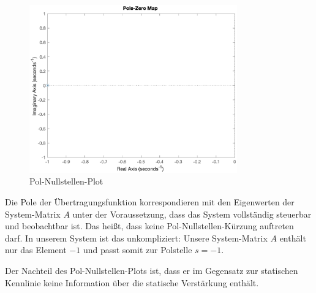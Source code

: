 \begin{figure}[H]
    \centering
    \includegraphics[width=0.8\textwidth]{Bilder/PoleZeroPT1Tt.eps}
    \caption{Pol-Nullstellen-Plot}
 \end{figure}

 Die Pole der Übertragungsfunktion korrespondieren mit den Eigenwerten der System-Matrix $A$ unter der Voraussetzung, dass das System vollständig steuerbar und beobachtbar ist.
 Das heißt, dass keine Pol-Nullstellen-Kürzung auftreten darf.
 In unserem System ist das unkompliziert: Unsere System-Matrix $A$ enthält nur das Element $-1$ und passt somit zur Polstelle $s = -1$.

 Der Nachteil des Pol-Nullstellen-Plots ist, dass er im Gegensatz zur statischen Kennlinie keine Information über die statische Verstärkung enthält.


